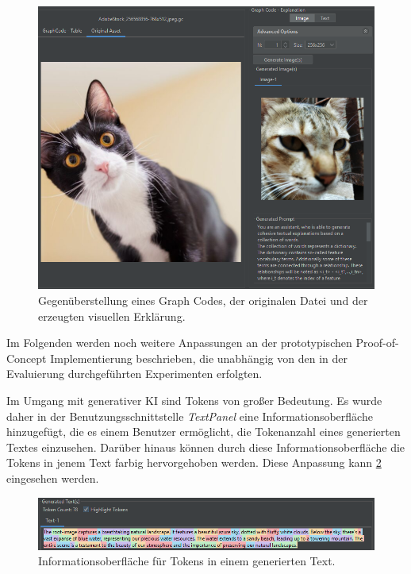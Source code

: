 \begin{figure}[!ht]
  \includegraphics[width=\textwidth]{chapter/chapter_5/gc-orig-exp}
  \caption{Gegenüberstellung eines Graph Codes, der originalen Datei und der erzeugten visuellen Erklärung.}
  \label{sec5:eval:subsec:adaptation:fig:gc-orig-exp}
\end{figure}

Im Folgenden werden noch weitere Anpassungen an der prototypischen Proof-of-Concept Implementierung beschrieben, die unabhängig von den in der Evaluierung durchgeführten Experimenten erfolgten.

Im Umgang mit generativer KI sind Tokens von großer Bedeutung.
Es wurde daher in der Benutzungsschnittstelle \textit{TextPanel} eine Informationsoberfläche hinzugefügt, die es einem Benutzer ermöglicht, die Tokenanzahl eines generierten Textes einzusehen.
Darüber hinaus können durch diese Informationsoberfläche die Tokens in jenem Text farbig hervorgehoben werden.
Diese Anpassung kann \cref{sec5:eval:subsec:adaptation:fig:custom-token-info} eingesehen werden.

\begin{figure}[!ht]
  \includegraphics[width=\textwidth]{chapter/chapter_5/custom-token-info}
  \caption{Informationsoberfläche für Tokens in einem generierten Text.}
  \label{sec5:eval:subsec:adaptation:fig:custom-token-info}
\end{figure}

